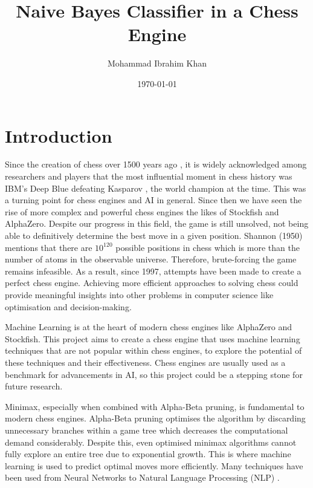 \documentclass[20pt]{informatics-report}
\title{Naive Bayes Classifier in a Chess Engine}
\author{Mohammad Ibrahim Khan}
\date{\today}
\begin{document}
\createFrontMatter
\onehalfspacing
\tableofcontents
\doublespacing


\chapter{Introduction}


Since the creation of chess over 1500 years ago \cite{davidsonShortHistoryChess2012}, it is widely acknowledged among researchers and players that the most influential moment in chess history was IBM's Deep Blue defeating Kasparov \cite{hsuIBMsDeepBlue1999}, the world champion at the time. This was a turning point for chess engines and AI in general.
Since then we have seen the rise of more complex and powerful chess engines the likes of Stockfish and AlphaZero. Despite our progress in this field, the game is still unsolved, not being able to definitively determine the best move in a given position. Shannon (1950) mentions that there are $10^{120}$ possible positions in chess \cite{shannonXXIIProgrammingComputer1950} which is more than the number of atoms in the observable universe. Therefore, brute-forcing the game remains infeasible. As a result, since 1997, attempts have been made to create a perfect chess engine. Achieving more efficient approaches to solving chess could provide meaningful insights into other problems in computer science like optimisation and decision-making.

Machine Learning is at the heart of modern chess engines like AlphaZero and Stockfish.  
This project aims to create a chess engine that uses machine learning techniques that are not popular within chess engines, to explore the potential of these techniques and their effectiveness. Chess engines are usually used as a benchmark for advancements in AI, so this project could be a stepping stone for future research. 

Minimax, especially when combined with Alpha-Beta pruning, is fundamental to modern chess engines. Alpha-Beta pruning optimises the algorithm by discarding unnecessary branches within a game tree which decreases the computational demand considerably. Despite this, even optimised minimax algorithms cannot fully explore an entire tree due to exponential growth. This is where machine learning is used to predict optimal moves more efficiently. Many techniques have been used from Neural Networks \cite{kleinNeuralNetworksChess2022} to Natural Language Processing (NLP) \cite{NLPinChess}. 
\end{document}
